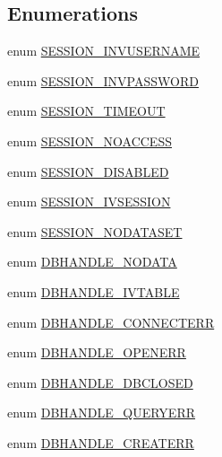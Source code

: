 \subsection*{Enumerations}
\begin{Indent}{\bf }\par
\begin{CompactItemize}
\item 
enum \hyperlink{owl_8statuscodes_8php_9d228a8481d3e68d6c8034fd41e1284f}{SESSION\_\-INVUSERNAME} 
\item 
enum \hyperlink{owl_8statuscodes_8php_44b42092523fa97db313970c190ea28b}{SESSION\_\-INVPASSWORD} 
\item 
enum \hyperlink{owl_8statuscodes_8php_9f864ccc821ad3799322c4a6793796dc}{SESSION\_\-TIMEOUT} 
\item 
enum \hyperlink{owl_8statuscodes_8php_a1062a5298847727e0d3be4eab23d210}{SESSION\_\-NOACCESS} 
\item 
enum \hyperlink{owl_8statuscodes_8php_776112495f2ed2c5e256dcdfad21fe7e}{SESSION\_\-DISABLED} 
\item 
enum \hyperlink{owl_8statuscodes_8php_9897ac79456358fa862ca33fdea13bb9}{SESSION\_\-IVSESSION} 
\item 
enum \hyperlink{owl_8statuscodes_8php_61e828f14b93df840752f73190104a50}{SESSION\_\-NODATASET} 
\end{CompactItemize}
\end{Indent}
\begin{Indent}{\bf }\par
\begin{CompactItemize}
\item 
enum \hyperlink{owl_8statuscodes_8php_d8e472506309827bb507ccf4f1545e0e}{DBHANDLE\_\-NODATA} 
\item 
enum \hyperlink{owl_8statuscodes_8php_6d2955056daf49887e50eea132eb595e}{DBHANDLE\_\-IVTABLE} 
\item 
enum \hyperlink{owl_8statuscodes_8php_9a343c4560417e293caa709e22646196}{DBHANDLE\_\-CONNECTERR} 
\item 
enum \hyperlink{owl_8statuscodes_8php_b64cc6f10455b678241bc8b714100e16}{DBHANDLE\_\-OPENERR} 
\item 
enum \hyperlink{owl_8statuscodes_8php_ab8d7571a5e75d71060fbcb865433490}{DBHANDLE\_\-DBCLOSED} 
\item 
enum \hyperlink{owl_8statuscodes_8php_04ae2b6da16ff57c8c425aa57561b030}{DBHANDLE\_\-QUERYERR} 
\item 
enum \hyperlink{owl_8statuscodes_8php_e18225c004a543b76af09a71c10a8f4f}{DBHANDLE\_\-CREATERR} 
\end{CompactItemize}
\end{Indent}
